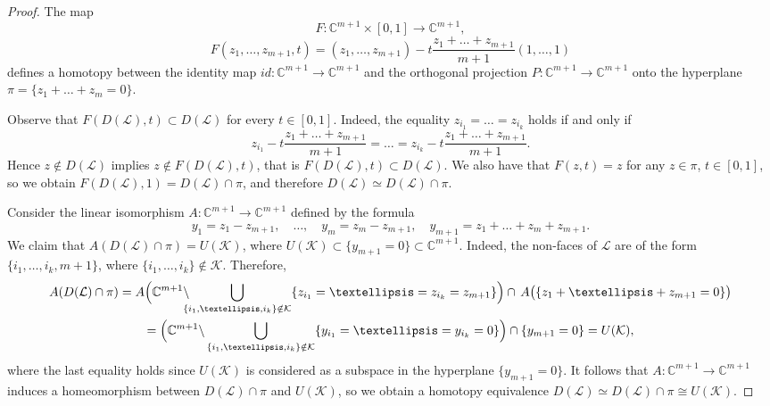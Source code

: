 \documentclass[10pt,a4paper]{amsart}
\newcommand{\CC}{\mathbb C}
\newcommand{\K}{\mathcal K}
\begin{document}
\begin{proof}
	The map
	$$F: \CC^{m+1}\times [0,1] \to \CC^{m+1},$$
	$$F(z_1, \dots, z_{m+1}, t) = (z_1, \dots, z_{m+1}) - t
	\frac{z_1 + \dots + z_{m+1}}{m+1} (1, \dots, 1)$$
	defines a homotopy between the identity map $id: \CC^{m+1} \to \CC^{m+1}$ and the orthogonal projection
	$P: \CC^{m+1} \to \CC^{m+1}$ onto the hyperplane $\pi = \{z_1 + \dots + z_m = 0\}$.
	
Observe that $F(D(\mathcal{L}), t) \subset D(\mathcal{L})$ for every $t \in [0, 1]$. 
	Indeed, the equality $z_{i_1} = \dots = z_{i_k}$ holds if and only if
	$$z_{i_1} - t \frac{z_1 + \dots + z_{m+1}}{m+1} = \dots = z_{i_k} - t \frac{z_1 + \dots + z_{m+1}}{m+1}.$$
	Hence $z \notin D(\mathcal{L})$ implies $z \notin F(D(\mathcal{L}), t)$, that is $F(D(\mathcal{L}), t) \subset D(\mathcal{L})$.
	We also have that $F(z, t) = z$ for any $z \in \pi$, $t \in [0, 1]$,
	so we obtain $F(D(\mathcal{L}), 1) = D(\mathcal{L}) \cap \pi$,
	and therefore $D(\mathcal{L}) \simeq D(\mathcal{L}) \cap \pi$.
	
	Consider the linear isomorphism $A: \CC^{m+1} \to \CC^{m+1}$ defined by the formula
	$$y_1 = z_1 - z_{m+1},\quad \dots, \quad y_m = z_m - z_{m+1}, \quad y_{m+1} = z_1 + \dots + z_m + z_{m+1}.$$
	We claim that $A(D(\mathcal{L}) \cap \pi) = U(\K)$, where $U(\K) \subset \{y_{m+1} = 0\} \subset \CC^{m+1}$. 
	Indeed, %
    the non-faces of $\mathcal{L}$ are of the form $\{i_1, \dots, i_k, m+1\}$,
	where $\{i_1, \dots, i_k\} \notin \K$. Therefore,
\begin{multline*}
  A(D(\mathcal{L}) \cap \pi) = A\Bigl( { \CC^{m+1} \backslash\!\!\!\!\bigcup_{\{i_1, \dots, i_k\} \notin \K}
		\{z_{i_1} = \dots = z_{i_k} = z_{m+1} \} }\Bigr)  \cap \,A \bigl({ \{z_1 + \dots + z_{m+1} = 0\} }\bigr) \\
		= \Bigl({\CC^{m+1} \backslash \bigcup_{\{i_1, \dots, i_k\} \notin \K}
		\{y_{i_1} = \dots = y_{i_k} = 0 \} }\Bigr) \cap \{y_{m+1} = 0 \} = U(\K),
\end{multline*}  
where the last equality holds since $U(\K)$ is considered as a subspace in the hyperplane $\{y_{m+1} = 0\}$.
It follows that $A\colon \CC^{m+1} \to \CC^{m+1}$ induces a homeomorphism between $D(\mathcal{L}) \cap \pi$ and $U(\K)$, so we obtain a homotopy equivalence $D(\mathcal{L}) \simeq D(\mathcal{L})\cap \pi \cong U(\K)$.
\end{proof}
\end{document}
